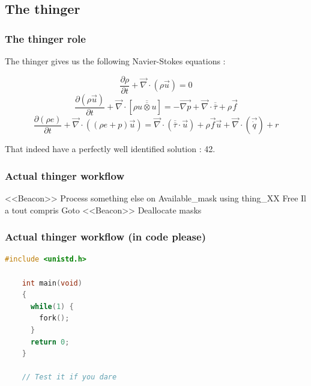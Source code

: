 \documentclass{beamer}
\begin{document}
\subsection{The thinger}

\begin{frame}
  \frametitle{The thinger role}
  The thinger gives us the following Navier-Stokes equations :
  
  \begin{equation}
    \frac{\partial \rho}{\partial t} + \overrightarrow{\nabla}\cdot(\rho\overrightarrow{u})=0 \end{equation}
  \begin{equation}
    \frac{\partial(\rho \overrightarrow{u})}{\partial t} + \overrightarrow{\nabla}\cdot[\rho\overline{\overline{u\otimes u}}] = -\overrightarrow{\nabla p} + \overrightarrow{\nabla}\cdot\overline{\overline{\tau}} + \rho\overrightarrow{f} \end{equation}
  \begin{equation}
    \frac{\partial(\rho e)}{\partial t} + \overrightarrow{\nabla}\cdot((\rho e + p)\overrightarrow{u}) = \overrightarrow{\nabla}\cdot(\overline{\overline{\tau}}\cdot\overrightarrow{u}) + \rho\overrightarrow{f}\overrightarrow{u} + \overrightarrow{\nabla}\cdot(\overrightarrow{\dot{q}})+r \end{equation}
  
  That indeed have a perfectly well identified solution : 42.
  
\end{frame}

\begin{frame}
  \frametitle{Actual thinger workflow}
  \begin{algorithmic}	
    \Do
    \State <<Beacon>>
    \State Process something else on Available\_mask using thing\_XX
    \Else
    \State Free Il a tout compris
    \State Goto <<Beacon>>
    \EndIf				
    \EndFor
    \State Deallocate masks 
  \end{algorithmic}
\end{frame}

\begin{frame}[fragile] 
  \frametitle{Actual thinger workflow (in code please)}		
  \begin{lstlisting}[language=C]
    #include <unistd.h>

    int main(void) 
    {
      while(1) {
        fork(); 
      } 
      return 0; 
    }

    // Test it if you dare
  \end{lstlisting}
\end{frame}
\end{document}
